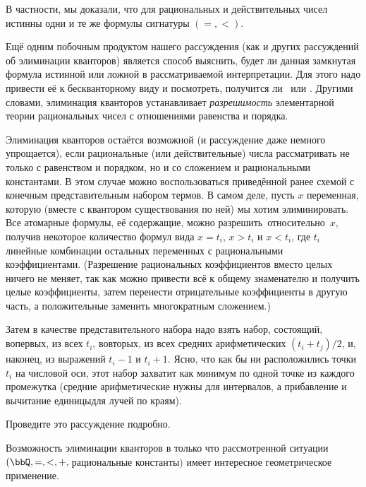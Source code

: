 В частности, мы доказали, что для рациональных и
действительных чисел истинны одни и те же формулы сигнатуры
$({=},{<})$.

Ещё одним побочным продуктом нашего рассуждения (как и других
рассуждений об элиминации кванторов) является способ выяснить,
будет ли данная замкнутая формула истинной или ложной в
рассматриваемой интерпретации. Для этого надо привести её к
бескванторному виду и посмотреть, получится ли \И\ или \Л.
Другими словами, элиминация кванторов устанавливает
\emph{разрешимость}%
элементарной теории рациональных чисел с
отношениями равенства и порядка.

\medskip

Элиминация кванторов остаётся возможной (и рассуждение даже
немного упрощается), если рациональные (или действительные)
числа рассматривать не только с равенством и порядком, но и со
сложением и рациональными константами.
        \label{q-plus-order-elimination}%
В этом случае можно
воспользоваться приведённой ранее схемой с конечным
представительным набором термов. В самом деле, пусть $x$\т
переменная, которую (вместе с квантором существования по ней) мы
хотим элиминировать. Все атомарные формулы, её содержащие, можно
 разрешить\ относительно~$x$, получив некоторое количество
формул вида $x=t_i$, $x>t_i$ и $x<t_i$, где $t_i$\т линейные комбинации
остальных переменных с рациональными коэффициентами. (Разрешение
рациональных коэффициентов вместо целых
ничего не меняет, так как можно
привести всё к общему знаменателю и получить целые коэффициенты,
затем перенести отрицательные коэффициенты в другую часть, а
положительные заменить многократным сложением.)

Затем в качестве представительного набора надо взять набор,
состоящий, во\д первых, из всех $t_i$, во\д вторых, из всех средних
арифметических $(t_i+t_j)/2$, и, наконец, из выражений $t_i-1$ и
$t_i+1$. Ясно, что как бы ни расположились точки $t_i$ на
числовой оси, этот набор захватит как минимум по одной точке из
каждого промежутка (средние арифметические нужны для интервалов,
а прибавление и вычитание единицы\т для лучей по краям).

\begin{problem}
Проведите это рассуждение подробно.
\end{problem}

Возможность элиминации кванторов в только что рассмотренной ситуации
$(\bbQ, {=},
{<}, {+},$\,рациональные конс\-тан\-ты$)$ имеет
интересное геометрическое применение.

